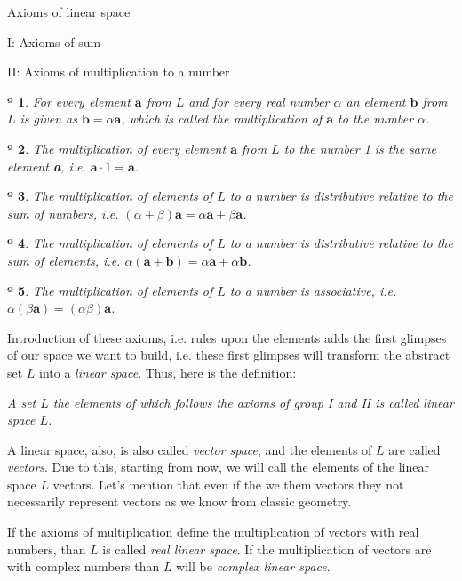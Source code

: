 \documentclass{book}
\newtheorem{axiom}{º}
\begin{document}
\begin{section}{Axioms of linear space}
\begin{subsection}{I: Axioms of sum}
\end{subsection}
\begin{subsection}{II: Axioms of multiplication to a number}
\begin{axiom} For every element $\textbf{a}$ from $L$ and for every real number $\alpha$ an element $\textbf{b}$ from $L$ is given as $\textbf{b} = \alpha \textbf{a}$, which is called the multiplication of $\textbf{a}$ to the number $\alpha$.
\end{axiom}

\begin{axiom} The multiplication of every element $\textbf{a}$ from $L$ to the number 1 is the same element \textbf{a}, i.e. $\textbf{a} \cdot 1 = \textbf{a}$.
\end{axiom}

\begin{axiom} The multiplication of elements of $L$ to a number is distributive relative to the sum of numbers, i.e. $(\alpha + \beta)\textbf{a} = \alpha \textbf{a} + \beta \textbf{a}$.
\end{axiom}

\begin{axiom}
The multiplication of elements of $L$ to a number is distributive relative to the sum of elements, i.e. $\alpha (\textbf{a} + \textbf{b}) = {\alpha} \textbf{a} + {\alpha} \textbf{b}$.
\end{axiom}

\begin{axiom} The multiplication of elements of $L$ to a number is associative, i.e. $\alpha (\beta \textbf{a}) = (\alpha \beta) \textbf{a}$.
\end{axiom}
\end{subsection}

Introduction of these axioms, i.e. rules upon the elements adds the first glimpses of our space we want to build, i.e. these first glimpses will transform the abstract set $L$ into a \emph{linear space}. Thus, here is the definition:

\emph{A set $L$ the elements of which follows the axioms of group I and II is called linear space $L$.}

A linear space, also, is also called \emph{vector space}, and the elements of $L$ are called \emph{vectors}. Due to this, starting from now, we will call the elements of the linear space $L$ vectors. Let's mention that even if the we them vectors they not necessarily represent vectors as we know from classic geometry.

If the axioms of multiplication define the multiplication of vectors with real numbers, than $L$ is called \emph{real linear space}. If the multiplication of vectors are with complex numbers than $L$ will be \emph{complex linear space}.
\end{section}
\end{document}
